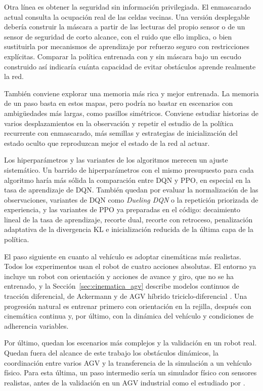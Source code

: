 Otra línea es obtener la seguridad sin información privilegiada. El
enmascarado actual consulta la ocupación real de las celdas vecinas. Una versión desplegable
debería construir la máscara a partir de las lecturas del propio sensor o
de un sensor de seguridad de corto alcance, con el ruido que ello
implica, o bien sustituirla por mecanismos de aprendizaje por refuerzo
seguro con restricciones explícitas. Comparar la política entrenada con y
sin máscara bajo un escudo construido así indicaría cuánta capacidad de
evitar obstáculos aprende realmente la red.

También conviene explorar una memoria más rica y mejor entrenada. La
memoria de un paso basta en estos mapas, pero podría no bastar en escenarios con ambigüedades más
largas, como pasillos simétricos. Conviene estudiar historias de varios
desplazamientos en la observación y repetir el estudio de la política
recurrente con enmascarado, más semillas y estrategias de inicialización
del estado oculto que reproduzcan mejor el estado de la red al actuar.

Los hiperparámetros y las variantes de los algoritmos merecen un ajuste
sistemático. Un barrido de hiperparámetros con el mismo presupuesto para
cada algoritmo haría más sólida la comparación entre DQN y PPO, en
especial en la tasa de aprendizaje de DQN. También quedan por evaluar la
normalización de las observaciones, variantes de DQN como
\textit{Dueling DQN} o la repetición priorizada de experiencia, y las
variantes de PPO ya preparadas en el código: decaimiento lineal de la
tasa de aprendizaje, recorte dual, recorte con retroceso, penalización
adaptativa de la divergencia KL e inicialización reducida de la última
capa de la política.

El paso siguiente en cuanto al vehículo es adoptar cinemáticas más
realistas. Todos los experimentos usan el robot de cuatro acciones
absolutas. El entorno ya incluye un robot con orientación
y acciones de avance y giro, que no se ha entrenado, y la
Sección~\ref{sec:cinematica_agv} describe modelos continuos de
tracción diferencial, de Ackermann y de AGV híbrido triciclo-diferencial
\citep{sanchez2022modelado}. Una progresión natural es entrenar primero
con orientación en la rejilla, después con cinemática continua y, por
último, con la dinámica del vehículo y condiciones de adherencia
variables.

Por último, quedan los escenarios más complejos y la validación en un
robot real. Quedan fuera del alcance de este trabajo los obstáculos dinámicos, la
coordinación entre varios AGV y la transferencia de la simulación a un
vehículo físico. Para esta última, un paso intermedio sería un simulador
físico con sensores realistas, antes de la validación en un AGV
industrial como el estudiado por \citet{sanchez2022modelado}.
